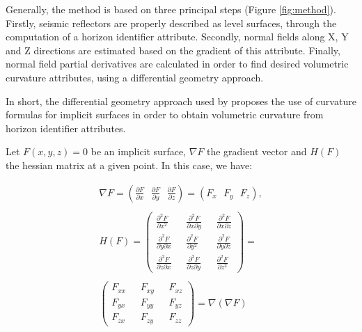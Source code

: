 \documentclass[conference]{IEEEtran}
\begin{document}
Generally, the method is based on three principal steps (Figure \ref{fig:method}). Firstly, seismic reflectors are properly described as level surfaces, through the computation of a horizon identifier attribute. Secondly, normal fields along X, Y and Z directions are estimated based on the gradient of this attribute. Finally, normal field partial derivatives are calculated in order to find desired volumetric curvature attributes, using a differential geometry approach.

In short, the differential geometry approach used by \cite{martins} proposes the use of curvature formulas for implicit surfaces in order to obtain volumetric curvature from horizon identifier attributes.

Let $F(x,y,z) = 0$ be an implicit surface, $\nabla{F}$ the gradient vector and $H(F)$ the hessian matrix at a given point. In this case, we have:

\begin{equation} \label{eq:notation}
\begin{array}{cc}
\nabla{F} =  \left(\frac{\partial F}{\partial x} \mbox{  } \frac{\partial F}{\partial y} \mbox{  } \frac{\partial F}{\partial z} \right) = (F_x \mbox{ } F_y \mbox{ } F_z), \\\\
H(F) = \left(\begin{array}{rrr} \frac{\partial^2 F}{\partial x^2} \mbox{  } &  \frac{\partial^2 F}{\partial x \partial y} \mbox{  } & \frac{\partial^2 F}{\partial x \partial z}\\
				\frac{\partial^2 F}{\partial y \partial x} \mbox{  } &  \frac{\partial^2 F}{\partial y^2} \mbox{  } & \frac{\partial^2 F}{\partial y \partial z} \\
				\frac{\partial^2 F}{\partial z \partial x} \mbox{  } &  \frac{\partial^2 F}{\partial z \partial y} \mbox{  } & \frac{\partial^2 F}{\partial z^2} \end{array} \right) = \\\\ \left(\begin{array}{rrr} F_{xx} \mbox{ } & F_{xy} \mbox{ } & F_{xz} \\
					   F_{yx} \mbox{ } & F_{yy} \mbox{ } & F_{yz} \\
					   F_{zx} \mbox{ } & F_{zy} \mbox{ } & F_{zz} \end{array} \right) = \nabla{(\nabla{F})}
\end{array}
\end{equation}
\end{document}
